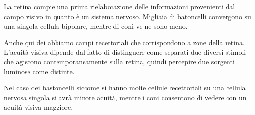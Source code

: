 \documentclass[]{article}
\begin{document}
La retina compie una prima rielaborazione delle informazioni provenienti
dal campo visivo in quanto è un sistema nervoso. Migliaia di batoncelli
convergono su una singola cellula bipolare, mentre di coni ve ne sono
meno.

Anche qui dei abbiamo campi recettoriali che corrispondono a zone della
retina. L'acuità visiva dipende dal fatto di distinguere come separati
due diversi stimoli che agiscono contemporaneamente sulla retina, quindi
percepire due sorgenti luminose come distinte.

Nel caso dei bastoncelli siccome si hanno molte cellule recettoriali su
una cellula nervosa singola si avrà minore acuità, mentre i coni
consentono di vedere con un acuità visiva maggiore.
\end{document}
